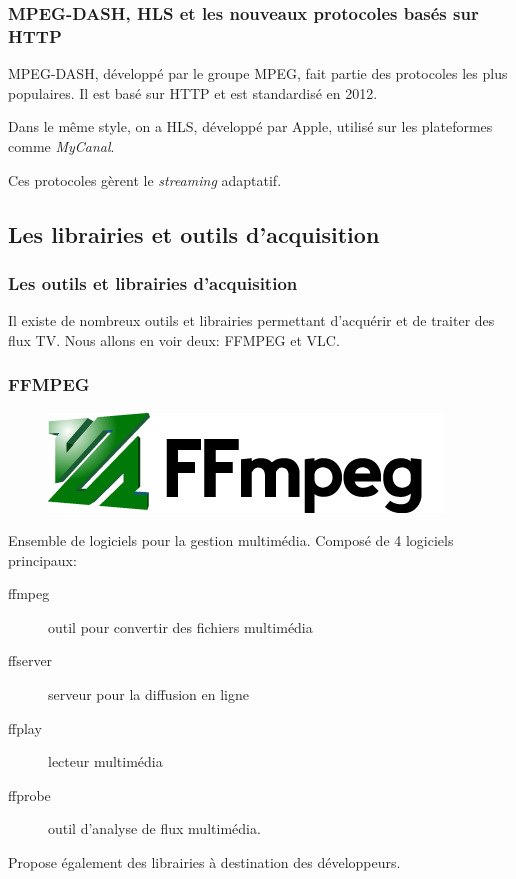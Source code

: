 \documentclass{beamer}
\begin{document}
\begin{frame}	
\frametitle{MPEG-DASH, HLS et les nouveaux protocoles basés sur HTTP}

MPEG-DASH, développé par le groupe MPEG, fait partie des protocoles les plus populaires. Il est basé sur HTTP et est standardisé en 2012. 

Dans le même style, on a HLS, développé par Apple, utilisé sur les plateformes comme \textit{MyCanal}.

Ces protocoles gèrent le \textit{streaming} adaptatif.

\end{frame}

\subsection{Les librairies et outils d'acquisition}


\begin{frame}	
\frametitle{Les outils et librairies d'acquisition}

Il existe de nombreux outils et librairies permettant d'acquérir et de traiter des flux TV. Nous allons en voir deux: FFMPEG et VLC.

\end{frame}

\begin{frame}	
\frametitle{FFMPEG}

\begin{figure}
	\includegraphics[scale=0.5]{Rapport_PR&D/images/ffmpeg}
\end{figure}

Ensemble de logiciels pour la gestion multimédia. Composé de 4 logiciels principaux: 

\begin{description}
	\item[ffmpeg] outil pour convertir des fichiers multimédia
	\item[ffserver] serveur pour la diffusion en ligne
	\item[ffplay] lecteur multimédia
	\item[ffprobe] outil d'analyse de flux multimédia.
\end{description}


Propose également des librairies à destination des développeurs.

\end{frame}
\end{document}
